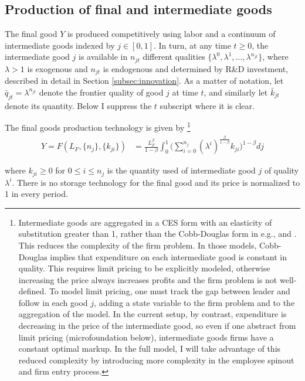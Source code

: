 \documentclass[11pt,english]{article}
\theoremstyle{remark}
\begin{document}
\subsection{Production of final and intermediate goods} \label{subsec:staticproduction}

The final good $Y$ is produced competitively using labor and a continuum of intermediate goods indexed by $j \in [0,1]$. In turn, at any time $t \ge 0$, the intermediate good $j$ is available in $n_{jt}$ different qualities $\{\lambda^0,\lambda^1,\ldots,\lambda^{n_{jt}}\}$, where $\lambda > 1$ is exogenous and $n_{jt}$ is endogenous and determined by R\&D investment, described in detail in Section \ref{subsec:innovation}. As a matter of notation, let $\bar{q}_{jt} = \lambda^{n_{jt}}$ denote the frontier quality of good $j$ at time $t$, and similarly let $\bar{k}_{jt}$ denote its quantity. Below I suppress the $t$ subscript where it is clear. 

The final goods production technology is given by \footnote{Intermediate goods are aggregated in a CES form with an elasticity of substitution greater than 1, rather than the Cobb-Douglas form in e.g., \cite{grossman_quality_1991} and \cite{baslandze_spinout_2019}. This reduces the complexity of the firm problem. In those models, Cobb-Douglas implies that expenditure on each intermediate good is constant in quality. This requires limit pricing to be explicitly modeled, otherwise increasing the price always increases profits and the firm problem is not well-defined. To model limit pricing, one must track the gap between leader and follow in each good $j$, adding a state variable to the firm problem and to the aggregation of the model. In the current setup, by contrast, expenditure is decreasing in the price of the intermediate good, so even if one abstract from limit pricing (microfoundation below), intermediate goods firms have a constant optimal markup. In the full model, I will take advantage of this reduced complexity by introducing more complexity in the employee spinout and firm entry process.}
\begin{align}
Y = F(L_F,\{n_j\},\{k_{ji}\}) &= \frac{L_F^{\beta}}{1-\beta} \int_0^1 \Big(\sum_{i = 0}^{n_{j}} (\lambda^{i})^{\frac{\beta}{1-\beta}} k_{ji} \Big)^{1-\beta} dj \label{final_goods_production}
\end{align}

where $k_{ji} \ge 0$ for $0 \le i \le n_j$ is the quantity used of intermediate good $j$ of quality $\lambda^i$. There is no storage technology for the final good and its price is normalized to 1 in every period. 
\end{document}

